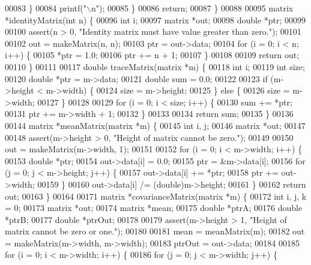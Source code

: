\begin{DoxyCode}
{{00083     \}
00084     printf(\textcolor{stringliteral}{"\(\backslash\)n"});
00085   \}
00086   \textcolor{keywordflow}{return};
00087 \}
00088 
00095 matrix *identityMatrix(\textcolor{keywordtype}{int} n) \{
00096   \textcolor{keywordtype}{int} i;
00097   matrix *out;
00098   \textcolor{keywordtype}{double} *ptr;
00099 
00100   assert(n > 0, \textcolor{stringliteral}{"Identity matrix must have value greater than zero."});
00101 
00102   out = makeMatrix(n, n);
00103   ptr = out->data;
00104   \textcolor{keywordflow}{for} (i = 0; i < n; i++) \{
00105     *ptr = 1.0;
00106     ptr += n + 1;
00107   \}
00108 
00109   \textcolor{keywordflow}{return} out;
00110 \}
00111 
00117 \textcolor{keywordtype}{double} traceMatrix(matrix *m) \{
00118   \textcolor{keywordtype}{int} i;
00119   \textcolor{keywordtype}{int} size;
00120   \textcolor{keywordtype}{double} *ptr = m->data;
00121   \textcolor{keywordtype}{double} sum = 0.0;
00122 
00123   \textcolor{keywordflow}{if} (m->height < m->width) \{
00124     size = m->height;
00125   \} \textcolor{keywordflow}{else} \{
00126     size = m->width;
00127   \}
00128 
00129   \textcolor{keywordflow}{for} (i = 0; i < size; i++) \{
00130     sum += *ptr;
00131     ptr += m->width + 1;
00132   \}
00133 
00134   \textcolor{keywordflow}{return} sum;
00135 \}
00136 
00144 matrix *meanMatrix(matrix *m) \{
00145   \textcolor{keywordtype}{int} i, j;
00146   matrix *out;
00147 
00148   assert(m->height > 0, \textcolor{stringliteral}{"Height of matrix cannot be zero."});
00149 
00150   out = makeMatrix(m->width, 1);
00151 
00152   \textcolor{keywordflow}{for} (i = 0; i < m->width; i++) \{
00153     \textcolor{keywordtype}{double} *ptr;
00154     out->data[i] = 0.0;
00155     ptr = &m->data[i];
00156     \textcolor{keywordflow}{for} (j = 0; j < m->height; j++) \{
00157       out->data[i] += *ptr;
00158       ptr += out->width;
00159     \}
00160     out->data[i] /= (double)m->height;
00161   \}
00162   \textcolor{keywordflow}{return} out;
00163 \}
00164 
00171 matrix *covarianceMatrix(matrix *m) \{
00172   \textcolor{keywordtype}{int} i, j, k = 0;
00173   matrix *out;
00174   matrix *mean;
00175   \textcolor{keywordtype}{double} *ptrA;
00176   \textcolor{keywordtype}{double} *ptrB;
00177   \textcolor{keywordtype}{double} *ptrOut;
00178 
00179   assert(m->height > 1, \textcolor{stringliteral}{"Height of matrix cannot be zero or one."});
00180 
00181   mean = meanMatrix(m);
00182   out = makeMatrix(m->width, m->width);
00183   ptrOut = out->data;
00184 
00185   \textcolor{keywordflow}{for} (i = 0; i < m->width; i++) \{
00186     \textcolor{keywordflow}{for} (j = 0; j < m->width; j++) \{
}}
\end{DoxyCode}
